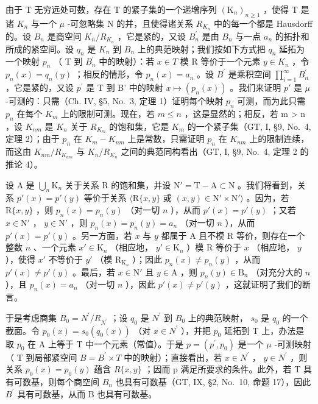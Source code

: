 由于 T 无穷远处可数，存在 T 的紧子集的一个递增序列 \((\mathrm{K}_{n})_{n\geqslant1}\) ，使得 T 是诸 \(K_{n}\) 与一个 \(\mu\) -可忽略集 N 的并，且使得诸关系 \(R_{K_{n}}\) 中的每一个都是 Hausdorff 的。设 \(B_{n}\) 是商空间 \(K_{n}/R_{K_{n}}\) ，它是紧的，又设 \(B_{n}^{\prime}\) 是由 \(B_{n}\) 与一点 \(a_{n}\) 的拓扑和所成的紧空间。设 \(q_{n}\) 是 \(K_{n}\) 到 \(B_{n}\) 上的典范映射；我们按如下方式把 \(q_{n}\) 延拓为一个映射 \(p_{n}\) （ T 到 \(B_{n}^{\prime}\) 中的映射）：若 \(x\in T\) 模 R 等价于一个元素 \(y\in K_{n}\) ，令 \(p_{n}(x)=q_{n}(y)\) ；相反的情形，令 \(p_{n}(x)=a_{n}\) 。设 \(B^{\prime}\) 是乘积空间 \(\prod_{i=1}^{\infty}B_{n}^{\prime}\) ，它是紧的，又设 \(p^{\prime}\) 是 T 到 B' 中的映射 \(x \mapsto (p_n(x))\) 。我们来证明 \(p'\) 是 \(\mu\) -可测的：只需（Ch. IV, §5, No.~3, 定理 1）证明每个映射 \(p_n\) 可测，而为此只需 \(p_n\) 在每个 \(K_m\) 上的限制可测。现在，若 \(m \leqslant n\) ，这是显然的；相反，若 m \textgreater{} n ，设 \(K_{nm}\) 是 \(K_n\) 关于 \(R_{K_m}\) 的饱和集，它是 \(K_m\) 的一个紧子集（GT, I, §9, No.~4, 定理 2）；由于 \(p_n\) 在 \(K_m - K_{nm}\) 上是常数，只需证明 \(p_n\) 在 \(K_{nm}\) 上的限制连续，而这由 \(K_{nm}/R_{K_{nm}}\) 与 \(K_n/R_{K_n}\) 之间的典范同构看出（GT, I, §9, No.~4, 定理 2 的推论 4）。

设 A 是 \(\bigcup_{n} \mathrm{K}_{n}\) 关于关系 R 的饱和集，并设 \(\mathrm{N}' = \mathrm{T} - \mathrm{A} \subset \mathrm{N}\) 。我们将看到，关系 \(p'(x) = p'(y)\) 等价于关系 \(\langle \mathrm{R}\{x, y\}\) 或 \((x, y) \in \mathrm{N}' \times \mathrm{N}' \rangle\) 。因为，若 \(\mathrm{R}\{x, y\}\) ，则 \(p_n(x) = p_n(y)\) （对一切 \(n\) ），从而 \(p'(x) = p'(y)\) ；又若 \(x \in \mathrm{N}'\) ， \(y \in \mathrm{N}'\) ，则 \(p_n(x) = p_n(y) = a_n\) （对一切 \(n\) ），从而 \(p'(x) = p'(y)\) 。另一方面，若 \(x\) 与 \(y\) 都属于 A 且不模 R 等价，则存在一个整数 \(n\) 、一个元素 \(x' \in \mathrm{K}_n\) （相应地， \(y' \in \mathrm{K}_n\) ）模 R 等价于 \(x\) （相应地， \(y\) ），使得 \(x'\) 不等价于 \(y'\) （模 \(\mathrm{R}_{\mathrm{K}_n}\) ）；因此 \(p_n(x) \neq p_n(y)\) ，从而 \(p'(x) \neq p'(y)\) 。最后，若 \(x \in \mathrm{N}'\) 且 \(y \in \mathrm{A}\) ，则 \(p_n(y) \in \mathrm{B}_n\) （对充分大的 \(n\) ），且 \(p_n(x) = a_n\) （对一切 \(n\) ），因此 \(p'(x) \neq p'(y)\) ，这就证明了我们的断言。

于是考虑商集 \(B_{0} = N^{\prime}/R_{N^{\prime}}\) ；设 \(q_{0}\) 是 \(N^{\prime}\) 到 \(B_{0}\) 上的典范映射， \(s_{0}\) 是 \(q_{0}\) 的一个截面。令 \(p_{0}(x) = s_{0}(q_{0}(x))\) （对 \(x \in N^{\prime}\) ），并把 \(p_{0}\) 延拓到 T 上，办法是取 \(p_{0}\) 在 A 上等于 T 中一个元素（常值）。于是 \(p = (p^{\prime}, p_{0})\) 是一个 \(\mu\) -可测映射（ T 到局部紧空间 \(B = B^{\prime} \times T\) 中的映射）；直接看出，若 \(x \in N^{\prime}\) ， \(y \in N^{\prime}\) ，则关系 \(p_{0}(x) = p_{0}(y)\) 蕴含 \(R\{x, y\}\) ；因而 p 满足所要求的条件。此外，若 T 具有可数基，则每个商空间 \(B_{n}\) 也具有可数基（GT, IX, §2, No.~10, 命题 17），因此 \(B^{\prime}\) 具有可数基，从而 B 也具有可数基。

